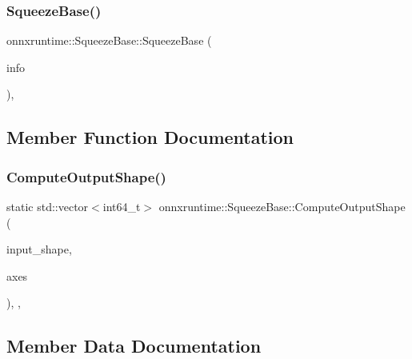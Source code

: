 \subsubsection{\texorpdfstring{Squeeze\+Base()}{SqueezeBase()}}
{\footnotesize\ttfamily onnxruntime\+::\+Squeeze\+Base\+::\+Squeeze\+Base (\begin{DoxyParamCaption}\item[{const \mbox{\hyperlink{classonnxruntime_1_1OpKernelInfo}{Op\+Kernel\+Info}} \&}]{info }\end{DoxyParamCaption})\hspace{0.3cm}{\ttfamily [inline]}, {\ttfamily [protected]}}



\subsection{Member Function Documentation}
\mbox{\label{classonnxruntime_1_1SqueezeBase_ac227d352a3342d4bf132384bbef59e33}} 
\subsubsection{\texorpdfstring{Compute\+Output\+Shape()}{ComputeOutputShape()}}
{\footnotesize\ttfamily static std\+::vector$<$int64\+\_\+t$>$ onnxruntime\+::\+Squeeze\+Base\+::\+Compute\+Output\+Shape (\begin{DoxyParamCaption}\item[{std\+::vector$<$ int64\+\_\+t $>$}]{input\+\_\+shape,  }\item[{std\+::vector$<$ int64\+\_\+t $>$}]{axes }\end{DoxyParamCaption})\hspace{0.3cm}{\ttfamily [inline]}, {\ttfamily [static]}, {\ttfamily [protected]}}



\subsection{Member Data Documentation}
\mbox{\label{classonnxruntime_1_1SqueezeBase_ade1fb6d5533768e91964993de22e84bb}} 
